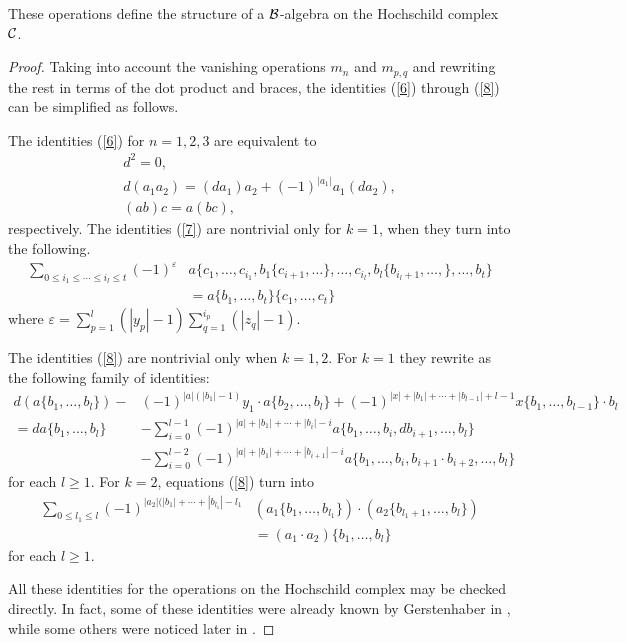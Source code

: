 \documentclass[TFM.tex]{subfiles}
\begin{document}
%

\begin{thm}
These operations define the structure of a $\mathcal{B}$-algebra on the Hochschild complex $\mathcal{C}$.
\end{thm}
\begin{proof}
Taking into account the vanishing operations $m_n$ and $m_{p,q}$ and rewriting
the rest in terms of the dot product and braces, the identities (\ref{6}) through (\ref{8}) can
be simplified as follows.

The identities (\ref{6}) for $n=1,2,3$ are equivalent to
\begin{gather*}
d^2=0,\\
d(a_1a_2)=(da_1)a_2+(-1)^{|a_1|}a_1(da_2),\\
(ab)c=a(bc),
\end{gather*}
respectively. The identities (\ref{7}) are nontrivial only for $k = 1$, when they turn into the following.
\begin{align*}
\sum_{0\leq i_1\leq\cdots\leq i_l\leq t}(-1)^{\varepsilon}&a\{c_1,\dots, c_{i_1},b_1\{c_{i+1},\dots\},\dots,c_{i_l},b_l\{b_{i_l+1},\dots,\},\dots,b_t\}\\
&=a\{b_1,\dots, b_t\}\{c_1,\dots, c_t\}
\end{align*}
where $\varepsilon=\sum_{p=1}^l(|y_p|-1)\sum_{q=1}^{i_p}(|z_q|-1)$.

The identities (\ref{8}) are nontrivial only when $k = 1,2$. For $k = 1$ they rewrite
as the following family of identities:
\begin{align*}
d(a\{b_1,\dots, b_l\})-&(-1)^{|a|(|b_1|-1)}y_1\cdot a\{b_2,\dots,b_l\}+(-1)^{|x|+|b_1|+\cdots+|b_{l-1}|+l-1}x\{b_1,\dots, b_{l-1}\}\cdot b_l\\
=da\{b_1,\dots, b_l\}&-\sum_{i=0}^{l-1}(-1)^{|a|+|b_1|+\cdots+|b_i|-i}a\{b_1,\dots, b_i,db_{i+1},\dots,b_l\}\\
&-\sum_{i=0}^{l-2}(-1)^{|a|+|b_1|+\cdots+|b_{i+1}|-i}a\{b_1,\dots, b_i,b_{i+1}\cdot b_{i+2},\dots,b_l\}
\end{align*}
for each $l ≥ 1$. For $k = 2$, equations (\ref{8}) turn into
\begin{align*}
\sum_{0\leq l_1\leq l}(-1)^{|a_2|(|b_1|+\cdots+|b_{l_1}|-l_1}&(a_1\{b_1,\dots, b_{l_1}\})\cdot(a_2\{b_{l_1+1},\dots, b_l\})\\
&=(a_1\cdot a_2)\{b_1,\dots, b_l\}
\end{align*}
for each $l ≥ 1$.

All these identities for the operations on the Hochschild complex may be checked
directly. In fact, some of these identities were already known by Gerstenhaber in \cite{Gerstenhaber}, while some others were noticed later in \cite{higher}.
\end{proof}
\end{document}
